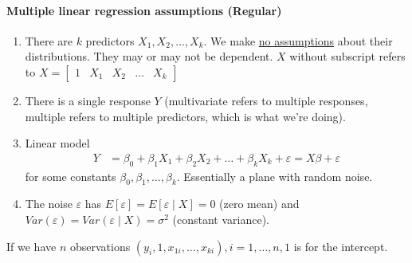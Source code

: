 \documentclass[12 pt]{article}
\begin{document}
  \paragraph{Multiple linear regression assumptions (Regular)}
  \begin{enumerate}
  \item There are $k$ predictors $X_1, X_2, \ldots, X_k$. We make
    \underline{no assumptions} about their distributions. They may or
    may not be dependent. $X$ without subscript refers to $X =
    \begin{bmatrix}
      1 & X_1 & X_2 & \ldots & X_k
    \end{bmatrix}
    $
  \item There is a single response $Y$ (multivariate refers to
    multiple responses, multiple refers to multiple predictors, which
    is what we're doing).
  \item Linear model
    \begin{align*}
      Y & = \beta_0 + \beta_1 X_1 + \beta_2 X_2 + \ldots + \beta_k X_k + \varepsilon = X\beta + \varepsilon
    \end{align*}
    for some constants $\beta_0, \beta_1, \ldots,
    \beta_k$. Essentially a plane with random noise.
  \item The noise $\varepsilon$ has $E[\varepsilon] = E [\varepsilon
    \mid X] = 0$ (zero mean) and $Var(\varepsilon) = Var(\varepsilon
    \mid X) = \sigma^2$ (constant variance).
  \end{enumerate}
  If we have $n$ observations $(y_i, 1, x_{1i}, \ldots, x_{ki}), i =
  1, \ldots, n, 1$ is for the intercept.
\end{document}
